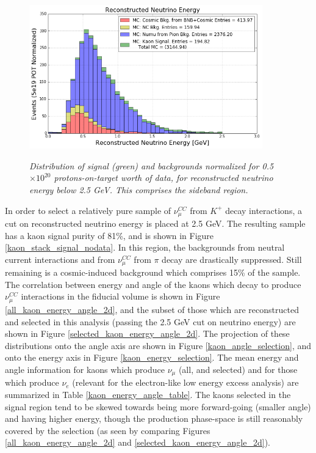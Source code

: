 \begin{figure}[ht!]
\centering
	\includegraphics[width=0.9\textwidth]{Figures/kaon_simonly_sideband.png} \\
\caption{\textit{Distribution of signal (green) and backgrounds normalized for 0.5 $\times 10^{20}$ protons-on-target worth of data, for reconstructed neutrino energy below 2.5 GeV. This comprises the sideband region.}}\label{kaon_stack_sideband_nodata}
\end{figure}

In order to select a relatively pure sample of $\nu_\mu^{CC}$ from $K^+$ decay interactions, a cut on reconstructed neutrino energy is placed at 2.5 GeV. The resulting sample has a kaon signal purity of 81\%, and is shown in Figure \ref{kaon_stack_signal_nodata}. In this region, the backgrounds from neutral current interactions and from $\nu_\mu^{CC}$ from $\pi$ decay are drastically suppressed. Still remaining is a cosmic-induced background which comprises 15\% of the sample. The correlation between energy and angle of the kaons which decay to produce $\nu_\mu^{CC}$ interactions in the fiducial volume is shown in Figure \ref{all_kaon_energy_angle_2d}, and the subset of those which are reconstructed and selected in this analysis (passing the 2.5 GeV cut on neutrino energy) are shown in Figure \ref{selected_kaon_energy_angle_2d}. The projection of these distributions onto the angle axis are shown in Figure \ref{kaon_angle_selection}, and onto the energy axis in Figure \ref{kaon_energy_selection}. The mean energy and angle information for kaons which produce $\nu_\mu$ (all, and selected) and for those which produce $\nu_e$ (relevant for the electron-like low energy excess analysis) are summarized in Table \ref{kaon_energy_angle_table}. The kaons selected in the signal region tend to be skewed towards being more forward-going (smaller angle) and having higher energy, though the production phase-space is still reasonably covered by the selection (as seen by comparing Figures \ref{all_kaon_energy_angle_2d} and \ref{selected_kaon_energy_angle_2d}).

